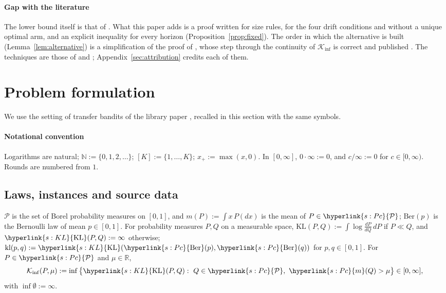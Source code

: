 \documentclass[11pt]{article}
\newcommand{\dt}[1]{\hypertarget{#1}{}}
\newcommand{\sy}[2]{\hyperlink{#1}{#2}}
\newcommand{\N}{\mathbb{N}}
\newcommand{\R}{\mathbb{R}}
\newcommand{\Pc}{\sy{s:Pc}{\mathcal{P}}}
\newcommand{\m}{\sy{s:Pc}{m}}
\newcommand{\Ber}{\sy{s:Pc}{\mathrm{Ber}}}
\newcommand{\KL}{\sy{s:KL}{\mathrm{KL}}}
\begin{document}
\paragraph{Gap with the literature} The lower bound itself is that of \citet[Theorem~2]{PMRM26}.
What this paper adds is a proof written for size rules, for the four drift conditions and without a
unique optimal arm, and an explicit inequality for every horizon (Proposition~\ref{prop:fixed}).
The order in which the alternative is built (Lemma~\ref{lem:alternative}) is a simplification of
the proof of \citet[Appendix~E]{PMRM26}, whose step through the continuity of $\mathcal K_{\inf}$
is correct and published \citep[Lemma~2 and Theorems~7--8]{HT10}. The techniques are those of \citet{GMS19} and \citet{PMRM26};
Appendix~\ref{sec:attribution} credits each of them.

\section{Problem formulation}\label{sec:setting}

We use the setting of transfer bandits of the library paper \citep[Section~3]{INC-P003}, recalled in this section with the same symbols.

\paragraph{Notational convention} Logarithms are natural; $\N:=\{0,1,2,\dots\}$; $[K]:=\{1,\dots,K\}$;
$x_+:=\max(x,0)$. In $[0,\infty]$, $0\cdot\infty:=0$, and $c/\infty:=0$ for $c\in[0,\infty)$.
Rounds are numbered from $1$.

\subsection{Laws, instances and source data}

\begin{definition}\label{def:laws}
\dt{s:Pc}$\mathcal P$ is the set of Borel probability measures on $[0,1]$, and $m(P):=\int x\,P(dx)$
is the mean of $P\in\Pc$; $\mathrm{Ber}(p)$ is the Bernoulli law of mean $p\in[0,1]$. For
probability measures $P,Q$ on a measurable space, \dt{s:KL}$\mathrm{KL}(P,Q):=\int\log\frac{dP}{dQ}\,dP$
if $P\ll Q$, and $\KL(P,Q):=\infty$ otherwise; $\mathrm{kl}(p,q):=\KL(\Ber(p),\Ber(q))$ for
$p,q\in[0,1]$. For $P\in\Pc$ and $\mu\in\R$,\dt{s:kinf}
\begin{equation*}
\mathcal K_{\inf}(P,\mu):=\inf\big\{\KL(P,Q):\ Q\in\Pc,\ \m(Q)>\mu\big\}\in[0,\infty],
\end{equation*}
with $\inf\emptyset:=\infty$.
\end{definition}
\end{document}

